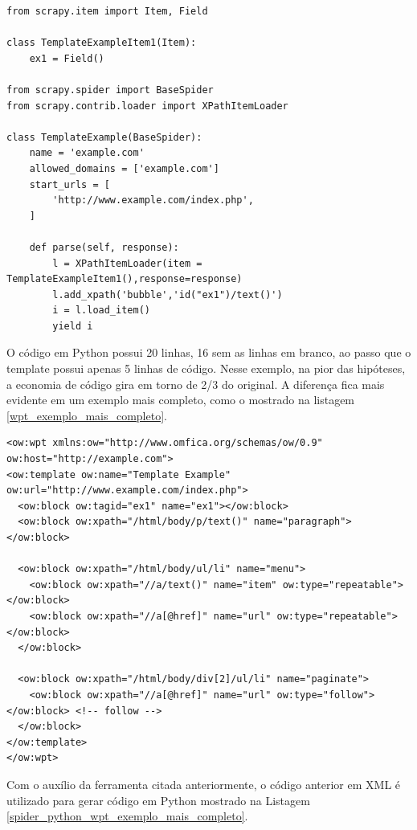 \begin{lstlisting}[label=spider_python_wpt_exemplo]
from scrapy.item import Item, Field

class TemplateExampleItem1(Item):
    ex1 = Field()

from scrapy.spider import BaseSpider
from scrapy.contrib.loader import XPathItemLoader

class TemplateExample(BaseSpider):
    name = 'example.com'
    allowed_domains = ['example.com']
    start_urls = [
        'http://www.example.com/index.php',
    ]
    
    def parse(self, response):
        l = XPathItemLoader(item = TemplateExampleItem1(),response=response)
        l.add_xpath('bubble','id("ex1")/text()') 
        i = l.load_item()
        yield i
\end{lstlisting}

O código em Python possui 20 linhas, 16 sem as linhas em branco, ao passo que o template possui apenas 5 linhas de código. Nesse exemplo, na pior das hipóteses, a economia de código gira em torno de 2/3 do original. A diferença fica mais evidente em um exemplo mais completo, como o mostrado na listagem \ref{wpt_exemplo_mais_completo}.

\begin{lstlisting}[label=wpt_exemplo_mais_completo]
<ow:wpt xmlns:ow="http://www.omfica.org/schemas/ow/0.9"
ow:host="http://example.com">
<ow:template ow:name="Template Example" ow:url="http://www.example.com/index.php">
  <ow:block ow:tagid="ex1" name="ex1"></ow:block>
  <ow:block ow:xpath="/html/body/p/text()" name="paragraph"></ow:block>
  
  <ow:block ow:xpath="/html/body/ul/li" name="menu">
    <ow:block ow:xpath="//a/text()" name="item" ow:type="repeatable"></ow:block>
    <ow:block ow:xpath="//a[@href]" name="url" ow:type="repeatable"></ow:block>
  </ow:block>
  
  <ow:block ow:xpath="/html/body/div[2]/ul/li" name="paginate">
    <ow:block ow:xpath="//a[@href]" name="url" ow:type="follow"></ow:block> <!-- follow -->
  </ow:block>
</ow:template> 
</ow:wpt>
\end{lstlisting}

Com o auxílio da ferramenta citada anteriormente, o código anterior em XML é utilizado para gerar código em Python mostrado na Listagem \ref{spider_python_wpt_exemplo_mais_completo}.

